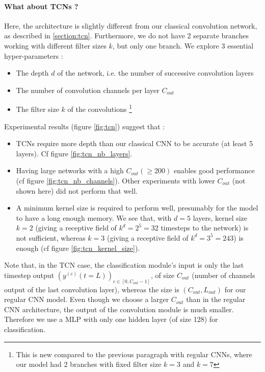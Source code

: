 \documentclass{article}
\begin{document}
\paragraph{What about TCNs ?}
Here, the architecture is slightly different from our classical convolution network, as described in \ref{section:tcn}. Furthermore, we do not have 2 separate branches working with different filter sizes $k$, but only one branch.
We explore 3 essential hyper-parameters :
\begin{itemize}
    \item The depth $d$ of the network, i.e. the number of successive convolution layers
    \item The number of convolution channels per layer $C_{out}$
    \item The filter size $k$ of the convolutions \footnote{This is new compared to the previous paragraph with regular CNNs, where our model had 2 branches with fixed filter size $k=3$ and $k=7$}
\end{itemize}
Experimental results (figure \ref{fig:tcn}) suggest that :
\begin{itemize}
    \item TCNs require more depth than our classical CNN to be accurate (at least 5 layers). Cf figure \ref{fig:tcn_nb_layers}.
    \item Having large networks with a high $C_{out} (\geq 200)$ enables good performance (cf figure \ref{fig:tcn_nb_channels}). Other experiments with lower $C_{out}$ (not shown here) did not perform that well.
    \item A minimum kernel size is required to perform well, presumably for the model to have a long enough memory. We see that, with $d=5$ layers, kernel size $k=2$ (giving a receptive field of $k^d=2^5=32$ timesteps to the network) is not sufficient, whereas $k=3$ (giving a receptive field of $k^d=3^5=243$) is enough (cf figure \ref{fig:tcn_kernel_size}).
\end{itemize}
\par
Note that, in the TCN case, the classification module's input is only the last timestep output $(y^{(c)}(t=L))_{c \in [0, C_{out}-1]}$, of size $C_{out}$ (number of channels output of the last convolution layer), whereas the size is $(C_{out}, L_{out})$ for our regular CNN model. Even though we choose a larger $C_{out}$ than in the regular CNN architecture, the output of the convolution module is much smaller. Therefore we use a MLP with only one hidden layer (of size 128) for classification.
\par
\end{document}
